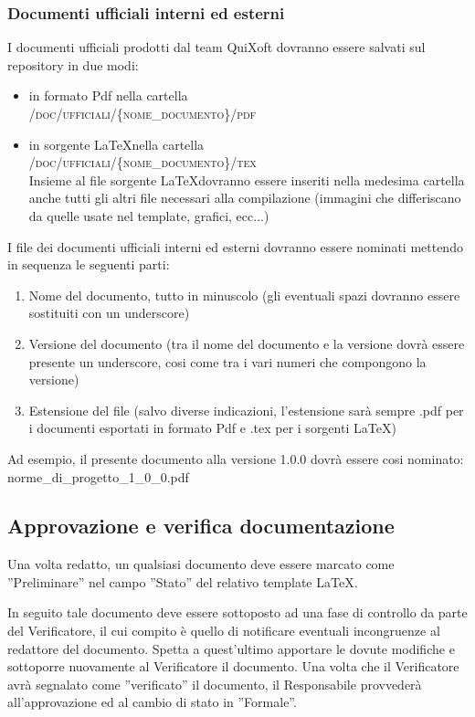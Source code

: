 \documentclass[11pt,a4paper]{article}
\begin{document}
\subsubsection{Documenti ufficiali interni ed esterni}
I documenti ufficiali prodotti dal team QuiXoft dovranno essere salvati sul repository in due modi:
\begin{itemize}
	\item in formato Pdf nella cartella 
\\ \textsc{/doc/ufficiali/\{nome\_documento\}/pdf}
	\item in sorgente \LaTeX \space nella cartella 
\\ \textsc{/doc/ufficiali/\{nome\_documento\}/tex}
\\ Insieme al file sorgente \LaTeX \space dovranno essere inseriti nella medesima cartella anche tutti gli altri file necessari alla compilazione (immagini che differiscano da quelle usate nel template, grafici, ecc...)
\end{itemize}

I file dei documenti ufficiali interni ed esterni dovranno essere nominati mettendo in sequenza le seguenti parti:
\begin{enumerate}
 \item Nome del documento, tutto in minuscolo (gli eventuali spazi dovranno essere sostituiti con un underscore)
 \item Versione del documento (tra il nome del documento e la versione dovrà essere presente un underscore, cosi come tra i vari numeri che compongono la versione)
 \item Estensione del file (salvo diverse indicazioni, l'estensione sarà sempre .pdf per i documenti esportati in formato Pdf e .tex per i sorgenti \LaTeX)
\end{enumerate}
Ad esempio, il presente documento alla versione 1.0.0 dovrà essere cosi nominato: norme\_di\_progetto\_1\_0\_0.pdf


\subsection{Approvazione e verifica documentazione}
Una volta redatto, un qualsiasi documento deve essere marcato come ''Preliminare'' nel campo ''Stato'' del relativo template \LaTeX.

In seguito tale documento deve essere sottoposto ad una fase di controllo da parte del Verificatore, il cui compito è quello di notificare eventuali incongruenze al redattore del documento.
Spetta a quest'ultimo apportare le dovute modifiche e sottoporre nuovamente al Verificatore il documento.
Una volta che il Verificatore avrà segnalato come ''verificato'' il documento, il Responsabile provvederà all'approvazione ed al cambio di stato in ''Formale''.
\end{document}
